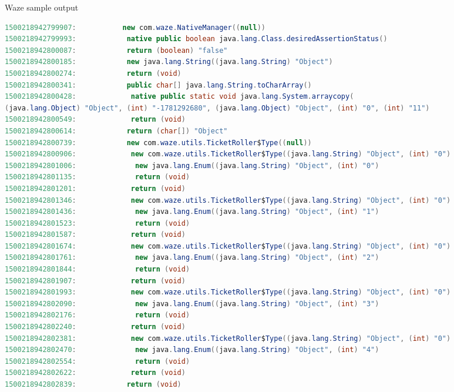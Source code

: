 \begin{listing}[!h]
  \begin{adjustwidth}{-9em}{-9em}
    \caption{Waze sample output}
    \label{lst:waze_output}
    \begin{lstlisting}[language=Java]
1500218942799907:           new com.waze.NativeManager((null))
1500218942799993:            native public boolean java.lang.Class.desiredAssertionStatus()
1500218942800087:            return (boolean) "false"
1500218942800185:            new java.lang.String((java.lang.String) "Object")
1500218942800274:            return (void)
1500218942800341:            public char[] java.lang.String.toCharArray()
1500218942800428:             native public static void java.lang.System.arraycopy(
(java.lang.Object) "Object", (int) "-1781292680", (java.lang.Object) "Object", (int) "0", (int) "11")
1500218942800549:             return (void)
1500218942800614:            return (char[]) "Object"
1500218942800739:            new com.waze.utils.TicketRoller$Type((null))
1500218942800906:             new com.waze.utils.TicketRoller$Type((java.lang.String) "Object", (int) "0")
1500218942801006:              new java.lang.Enum((java.lang.String) "Object", (int) "0")
1500218942801135:              return (void)
1500218942801201:             return (void)
1500218942801346:             new com.waze.utils.TicketRoller$Type((java.lang.String) "Object", (int) "0")
1500218942801436:              new java.lang.Enum((java.lang.String) "Object", (int) "1")
1500218942801523:              return (void)
1500218942801587:             return (void)
1500218942801674:             new com.waze.utils.TicketRoller$Type((java.lang.String) "Object", (int) "0")
1500218942801761:              new java.lang.Enum((java.lang.String) "Object", (int) "2")
1500218942801844:              return (void)
1500218942801907:             return (void)
1500218942801993:             new com.waze.utils.TicketRoller$Type((java.lang.String) "Object", (int) "0")
1500218942802090:              new java.lang.Enum((java.lang.String) "Object", (int) "3")
1500218942802176:              return (void)
1500218942802240:             return (void)
1500218942802381:             new com.waze.utils.TicketRoller$Type((java.lang.String) "Object", (int) "0")
1500218942802470:              new java.lang.Enum((java.lang.String) "Object", (int) "4")
1500218942802554:              return (void)
1500218942802622:             return (void)
1500218942802839:            return (void)
    \end{lstlisting}
  \end{adjustwidth}
\end{listing}
